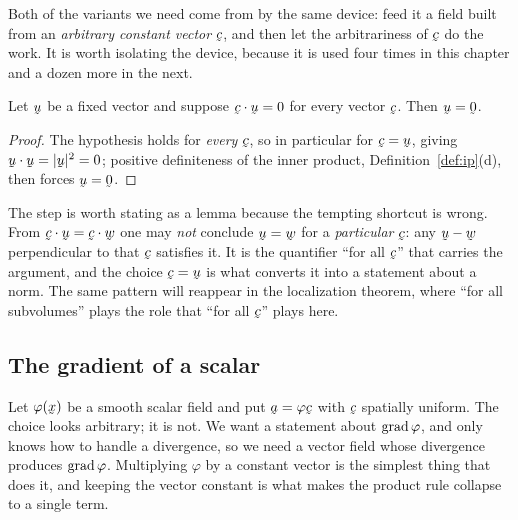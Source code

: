 Both of the variants we need come from  by the same device: feed
it a field built from an \emph{arbitrary constant vector} $\bc$, and then
let the arbitrariness of $\bc$ do the work. It is worth isolating the
device, because it is used four times in this chapter and a dozen more in
the next.

\begin{lemma}\label{lem:cvec}
Let $\bu$ be a fixed vector and suppose $\ip\bc\bu=0$ for every vector
$\bc$. Then $\bu=\bze$.
\end{lemma}

\begin{proof}
The hypothesis holds for \emph{every} $\bc$, so in particular for
$\bc=\bu$, giving $\ip\bu\bu=|\bu|^{2}=0$; positive definiteness of the
inner product, Definition~\ref{def:ip}(d), then forces $\bu=\bze$.
\end{proof}

\begin{remark}\label{rem:cancel}
The step is worth stating as a lemma because the tempting shortcut is
wrong. From $\ip\bc\bu=\ip\bc\bw$ one may \emph{not} conclude $\bu=\bw$
for a \emph{particular} $\bc$: any $\bu-\bw$ perpendicular to that $\bc$
satisfies it. It is the quantifier ``for all $\bc$'' that carries the
argument, and the choice $\bc=\bu$ is what converts it into a statement
about a norm. The same pattern will reappear in the localization theorem,
where ``for all subvolumes'' plays the role that ``for all $\bc$'' plays
here.
\end{remark}

\subsection*{The gradient of a scalar}

Let $\varphi(\bx)$ be a smooth scalar field and put $\ba=\varphi\bc$ with
$\bc$ spatially uniform. The choice looks arbitrary; it is not. We want a
statement about $\operatorname{grad}\varphi$, and  only knows how to handle a
divergence, so we need a vector field whose divergence produces
$\operatorname{grad}\varphi$. Multiplying $\varphi$ by a constant vector is the simplest
thing that does it, and keeping the vector constant is what makes the
product rule collapse to a single term.

